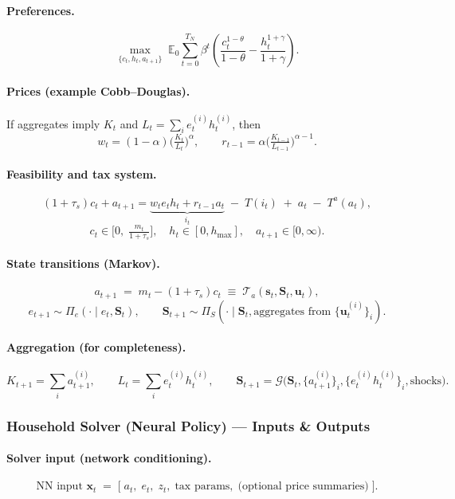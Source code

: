 \documentclass[11pt]{article}
\begin{document}
\paragraph{Preferences.}
\[
\max_{\{c_t,h_t,a_{t+1}\}} \; \mathbb{E}_0\sum_{t=0}^{T_N}\beta^t
\left( \frac{c_t^{1-\theta}}{1-\theta} - \frac{h_t^{1+\gamma}}{1+\gamma} \right).
\]

\paragraph{Prices (example Cobb–Douglas).}
If aggregates imply $K_t$ and $L_t=\sum_i e_t^{(i)}h_t^{(i)}$, then
\[
w_t=(1-\alpha)\Big(\tfrac{K_t}{L_t}\Big)^{\alpha},\qquad
r_{t-1}=\alpha\Big(\tfrac{K_{t-1}}{L_{t-1}}\Big)^{\alpha-1}.
\]

\paragraph{Feasibility and tax system.}
\[
(1+\tau_s)c_t + a_{t+1} = \underbrace{w_t e_t h_t + r_{t-1} a_t}_{i_t}
\;-\; T(i_t)\;+\; a_t \;-\; T^a(a_t),
\]
\[
c_t \in \Big[0,\;\tfrac{m_t}{1+\tau_s}\Big],\quad h_t\in[0,h_{\max}],\quad a_{t+1}\in[0,\infty).
\]

\paragraph{State transitions (Markov).}
\[
a_{t+1} \;=\; m_t - (1+\tau_s)c_t \;\equiv\; \mathcal{T}_a(\mathbf{s}_t,\mathbf{S}_t,\mathbf{u}_t),
\]
\[
e_{t+1} \sim \Pi_e(\cdot\mid e_t,\mathbf{S}_t),\qquad
\mathbf{S}_{t+1} \sim \Pi_S(\cdot\mid \mathbf{S}_t,\text{aggregates from }\{\mathbf{u}_t^{(i)}\}_i).
\]

\paragraph{Aggregation (for completeness).}
\[
K_{t+1}=\sum_i a_{t+1}^{(i)},\qquad L_t=\sum_i e_t^{(i)}h_t^{(i)},\qquad
\mathbf{S}_{t+1}=\mathcal{G}\big(\mathbf{S}_t,\{a_{t+1}^{(i)}\}_i,\{e_t^{(i)}h_t^{(i)}\}_i, \text{shocks}\big).
\]

\subsubsection{Household Solver (Neural Policy) — Inputs \& Outputs}

\paragraph{Solver input (network conditioning).}
\[
\text{NN input } \mathbf{x}_t \;=\; \Big[\; a_t,\; e_t,\; z_t,\; \text{tax params},\; \text{(optional price summaries)} \;\Big].
\]
\end{document}
